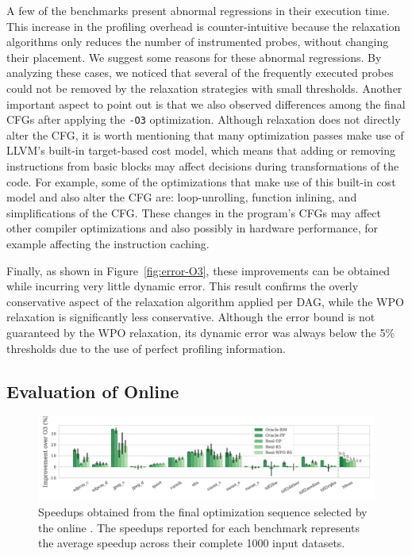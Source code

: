 A few of the benchmarks present abnormal regressions in their execution time.
This increase in the profiling overhead is counter-intuitive because the
relaxation algorithms only reduces the number of instrumented probes,
without changing their placement.
We suggest some reasons for these abnormal regressions.
By analyzing these cases, we noticed that several of the frequently executed
probes could not be removed by the relaxation strategies with small thresholds.
Another important aspect to point out is that we also observed
differences among the final CFGs after applying the \texttt{-O3} optimization.
Although relaxation does not directly alter the CFG, it is worth mentioning that
many optimization passes make use of LLVM's built-in target-based cost model,
which means that adding or removing instructions from basic blocks may affect
decisions during transformations of the code.
For example, some of the optimizations that make use of this built-in cost model
and also alter the CFG are: loop-unrolling, function inlining, and
simplifications of the CFG.
These changes in the program's CFGs may affect other compiler optimizations and
also possibly in hardware performance, for example affecting the instruction
caching.

Finally, as shown in Figure~\ref{fig:error-O3}, these improvements can be
obtained while incurring very little dynamic error.
This result confirms the overly conservative aspect of the relaxation algorithm
applied per DAG, while the WPO relaxation is significantly less conservative.
Although the error bound is not guaranteed by the WPO relaxation,
its dynamic error was always below the 5\% thresholds due to the use
of perfect profiling information.

\subsection{Evaluation of Online {\IterComp}}

\begin{figure}[t]
    \centering
    \includegraphics[width=\textwidth]{figs/speedups.pdf}
    \caption{Speedups obtained from the final optimization sequence selected by the online {\itercomp}.
	         The speedups reported for each benchmark represents the average speedup across their complete 1000 input datasets.}
    \label{fig:speedups}
\end{figure}

